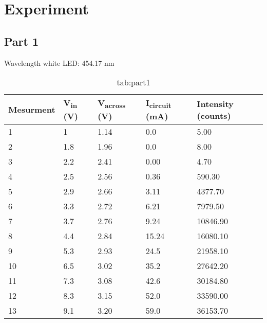 \section{Experiment}
\subsection{Part 1}



Wavelength white LED: 454.17 nm 




\begin{table}[H]
    \centering
    \begin{tabular}{@{}lllll@{}}
        \toprule
        Mesurment & V\textsubscript{in} (V) & V\textsubscript{across} (V) & I\textsubscript{circuit} (mA) & Intensity (counts) \\ \midrule
        1         & 1                       & 1.14                        & 0.0                           & 5.00               \\
        2         & 1.8                     & 1.96                        & 0.0                           & 8.00               \\
        3         & 2.2                     & 2.41                        & 0.00                          & 4.70               \\
        4         & 2.5                     & 2.56                        & 0.36                          & 590.30             \\
        5         & 2.9                     & 2.66                        & 3.11                          & 4377.70            \\
        6         & 3.3                     & 2.72                        & 6.21                          & 7979.50            \\
        7         & 3.7                     & 2.76                        & 9.24                          & 10846.90           \\
        8         & 4.4                     & 2.84                        & 15.24                         & 16080.10           \\
        9         & 5.3                     & 2.93                        & 24.5                          & 21958.10           \\
        10        & 6.5                     & 3.02                        & 35.2                          & 27642.20           \\
        11        & 7.3                     & 3.08                        & 42.6                          & 30184.80           \\
        12        & 8.3                     & 3.15                        & 52.0                          & 33590.00           \\
        13        & 9.1                     & 3.20                        & 59.0                          & 36153.70           \\ \bottomrule
        \end{tabular}
    \caption{tab:part1}
    \end{table}


    
